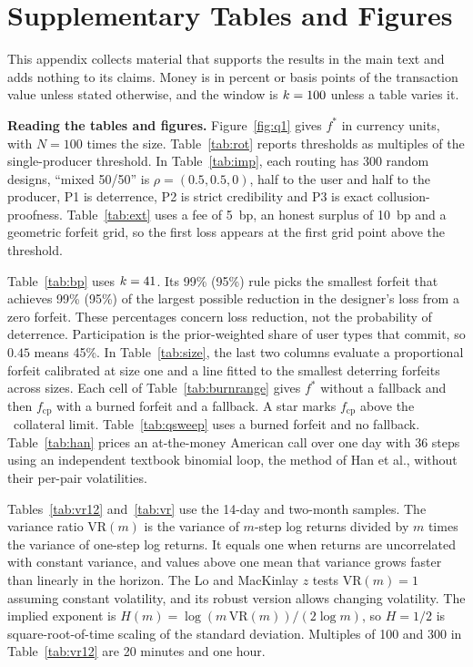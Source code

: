 \documentclass[11pt]{article}
\begin{document}
\section{Supplementary Tables and Figures}
This appendix collects material that supports the results in the main text and adds nothing to its claims. Money is in percent or basis points of the transaction value unless stated otherwise, and the window is $k=100$ unless a table varies it.

\textbf{Reading the tables and figures.} Figure~\ref{fig:q1} gives $f^*$ in currency units, with $N=100$ times the size. Table~\ref{tab:rot} reports thresholds as multiples of the single-producer threshold. In Table~\ref{tab:imp}, each routing has 300 random designs, ``mixed 50/50'' is $\rho=(0.5,0.5,0)$, half to the user and half to the producer, P1 is deterrence, P2 is strict credibility and P3 is exact collusion-proofness. Table~\ref{tab:ext} uses a fee of 5~bp, an honest surplus of 10~bp and a geometric forfeit grid, so the first loss appears at the first grid point above the threshold.

Table~\ref{tab:bp} uses $k=41$. Its 99\% (95\%) rule picks the smallest forfeit that achieves 99\% (95\%) of the largest possible reduction in the designer's loss from a zero forfeit. These percentages concern loss reduction, not the probability of deterrence. Participation is the prior-weighted share of user types that commit, so $0.45$ means 45\%. In Table~\ref{tab:size}, the last two columns evaluate a proportional forfeit calibrated at size one and a line fitted to the smallest deterring forfeits across sizes. Each cell of Table~\ref{tab:burnrange} gives $f^*$ without a fallback and then $f_{\mathrm{cp}}$ with a burned forfeit and a fallback. A star marks $f_{\mathrm{cp}}$ above the \KappaAssumed\ collateral limit. Table~\ref{tab:qsweep} uses a burned forfeit and no fallback. Table~\ref{tab:han} prices an at-the-money American call over one day with 36 steps using an independent textbook binomial loop, the method of Han et al., without their per-pair volatilities.

Tables~\ref{tab:vr12} and~\ref{tab:vr} use the 14-day and two-month samples. The variance ratio $\mathrm{VR}(m)$ is the variance of $m$-step log returns divided by $m$ times the variance of one-step log returns. It equals one when returns are uncorrelated with constant variance, and values above one mean that variance grows faster than linearly in the horizon. The Lo and MacKinlay $z$ tests $\mathrm{VR}(m)=1$ assuming constant volatility, and its robust version allows changing volatility. The implied exponent is $H(m)=\log(m\,\mathrm{VR}(m))/(2\log m)$, so $H=1/2$ is square-root-of-time scaling of the standard deviation. Multiples of 100 and 300 in Table~\ref{tab:vr12} are 20 minutes and one hour.
\end{document}
